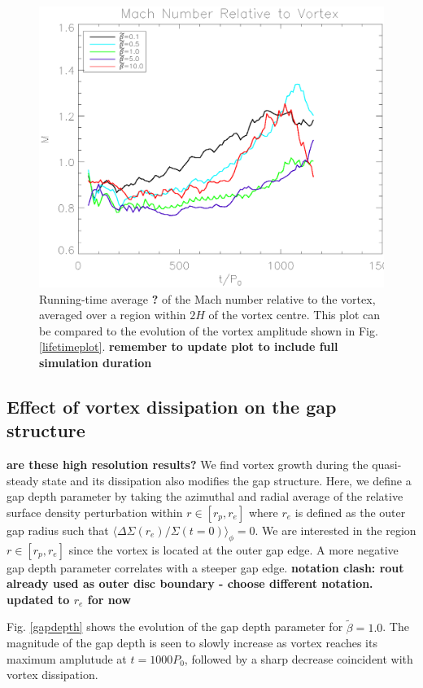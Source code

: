 \begin{figure}
    \includegraphics[width=\linewidth]{figures/mach}
 \caption{Running-time average {\bf ?} of the Mach number relative to
   the vortex, averaged over a region within $2H$ of the  
   vortex centre. This plot can be compared to the evolution of the
   vortex amplitude shown in Fig. \ref{lifetimeplot}.
   {\bf remember to update plot to include full simulation duration}
   \label{machplot}}
\end{figure}

\subsection{Effect of vortex dissipation on the gap structure} 
{\bf are these high resolution results?}
We find vortex growth during the quasi-steady state and its dissipation
also modifies the gap structure. Here, we 
define a gap depth parameter by taking the azimuthal and radial average
of the relative surface density perturbation within $r\in[r_p,r_e]$ where
$r_{e}$ is defined as the outer gap radius such that 
$\langle\Delta \Sigma(r_e)/\Sigma(t=0)\rangle_{\phi}=0$. We are
interested in the region $r \in[r_p,r_e]$ since the vortex is
located at the outer gap edge. A more negative gap depth parameter
correlates with a steeper gap edge. 
{\bf notation clash: rout already used as outer disc boundary - choose
different notation. updated to $r_e$ for now}

Fig. \ref{gapdepth} shows the evolution of the gap depth parameter
for $\tilde\beta=1.0$. The magnitude of the gap depth is seen to 
slowly increase as vortex reaches its maximum amplutude at
$t=1000P_0$, followed by a sharp decrease coincident with vortex
dissipation.  

